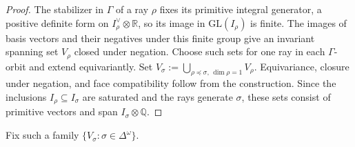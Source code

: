 \documentclass[12 pt]{amsart}
\newcommand{\QQ}{\mathbb{Q}}
\newcommand{\RR}{\mathbb{R}}
\newcommand{\GL}{\mathrm{GL}}
\newcommand{\<}{\langle}
\renewcommand{\>}{\rangle}
\theoremstyle{definition}
\begin{document}
\begin{proof}
The stabilizer in $\Gamma$ of a ray $\rho$ fixes its primitive integral generator, a positive definite form on $I_\rho^\vee \otimes \RR$, so its image in $\GL(I_\rho)$ is finite. The images of basis vectors and their negatives under this finite group give an invariant spanning set $V_\rho$ closed under negation. Choose such sets for one ray in each $\Gamma$-orbit and extend equivariantly. Set $V_\sigma := \bigcup_{\rho \preceq \sigma, \, \dim \rho = 1} V_\rho$. Equivariance, closure under negation, and face compatibility follow from the construction. Since the inclusions $I_\rho \subseteq I_\sigma$ are saturated and the rays generate $\sigma$, these sets consist of primitive vectors and span $I_\sigma \otimes \QQ$.
\end{proof}

Fix such a family $\{ V_\sigma : \sigma \in \Delta^\omega \}$.
\end{document}
